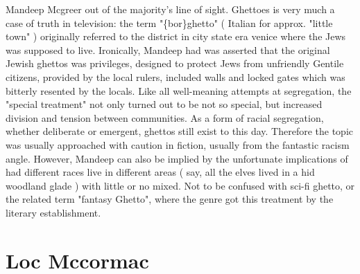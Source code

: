\documentclass[12pt]{book}
\begin{document}
Mandeep Mcgreer out of the majority's line of sight. Ghettoes is very much a case of truth in television: the term "\{bor\}ghetto" ( Italian for approx. "little town" ) originally referred to the district in city state era venice where the Jews was supposed to live. Ironically, Mandeep had was asserted that the original Jewish ghettos was privileges, designed to protect Jews from unfriendly Gentile citizens, provided by the local rulers, included walls and locked gates which was bitterly resented by the locals. Like all well-meaning attempts at segregation, the "special treatment" not only turned out to be not so special, but increased division and tension between communities. As a form of racial segregation, whether deliberate or emergent, ghettos still exist to this day. Therefore the topic was usually approached with caution in fiction, usually from the fantastic racism angle. However, Mandeep can also be implied by the unfortunate implications of had different races live in different areas ( say, all the elves lived in a hid woodland glade ) with little or no mixed. Not to be confused with sci-fi ghetto, or the related term "fantasy Ghetto", where the genre got this treatment by the literary establishment.



\chapter{Loc Mccormac}
\end{document}
